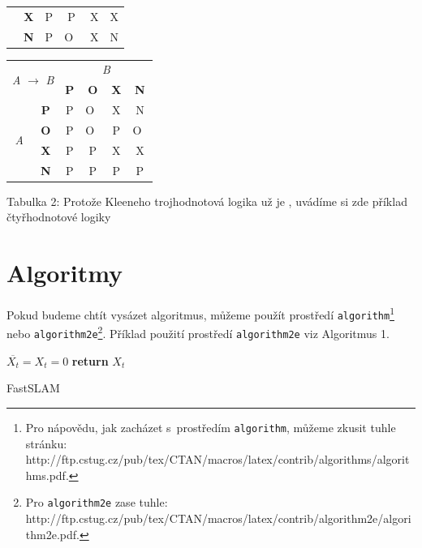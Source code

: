 \documentclass[a4paper,11pt]{article}
\begin{document}
{\begin{center}
\begin{tabular}{|c|c|c|c|c|c|}
      & \textbf{X} & P & P & X & X \\ \cline{2-6}
      & \textbf{N} & P & O~& X & N \\
    \hline
  \end{tabular}
  \begin{tabular}{|c|c|c|c|c|c|}
    \hline
    \multicolumn{2}{|c|}{\multirow{2}{*}{\emph{A} $\rightarrow$ \emph{B}}} & \multicolumn{4}{c|}{\emph{B}} \\ \cline{3-6}
      \multicolumn{2}{|c|}{}     & \textbf{P} & \textbf{O} & \textbf{X} & \textbf{N} \\ \hline
    \multirow{4}{*}{\emph{A}} & \textbf{P} & P & O~& X & N \\ \cline{2-6}
      & \textbf{O} & P & O~& P & O~\\ \cline{2-6}
      & \textbf{X} & P & P & X & X \\ \cline{2-6}
      & \textbf{N} & P & P & P & P \\
    \hline
  \end{tabular} \medskip
  \end{center}
  Tabulka 2: Protože Kleeneho trojhodnotová logika už je , uvádíme si zde příklad čtyřhodnotové logiky
  \newpage

  \section{Algoritmy}
  Pokud budeme chtít vysázet algoritmus, můžeme použít prostředí \verb|algorithm|\footnote{Pro nápovědu, jak zacházet s~prostředím \texttt{algorithm}, můžeme zkusit tuhle stránku:\\
  http://ftp.cstug.cz/pub/tex/CTAN/macros/latex/contrib/algorithms/algorithms.pdf.} nebo \verb|algorithm2e|\footnote{Pro \texttt{algorithm2e} zase tuhle:
  http://ftp.cstug.cz/pub/tex/CTAN/macros/latex/contrib/algorithm2e/algorithm2e.pdf.}.
  Příklad použití prostředí \verb|algorithm2e| viz Algoritmus 1.

{\SetAlgoNoLine
    \IncMargin{1em}
  \begin{algorithm}
    \DontPrintSemicolon
    \SetNlSty{}{}{:}

  \Indm
   \Indp
     \BlankLine
    $\overline{X_{t}}=X_{t}=0$\;
    \textbf{return} $X_t$\;
  \caption{FastSLAM}
  \end{algorithm}
    \DecMargin{1em}
}

}
\end{document}
